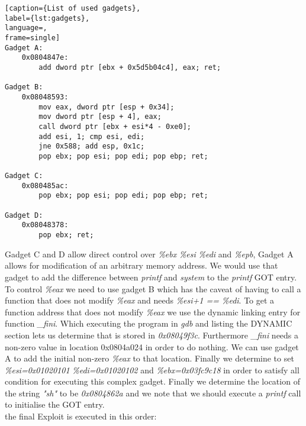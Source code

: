 \begin{minipage}{\linewidth}
\begin{lstlisting}[caption={List of used gadgets},
label={lst:gadgets},
language=,
frame=single]
Gadget A:
	0x0804847e:
		add dword ptr [ebx + 0x5d5b04c4], eax; ret;

Gadget B:
	0x08048593:
		mov eax, dword ptr [esp + 0x34];
		mov dword ptr [esp + 4], eax;
		call dword ptr [ebx + esi*4 - 0xe0];
		add esi, 1; cmp esi, edi;
		jne 0x588; add esp, 0x1c;
		pop ebx; pop esi; pop edi; pop ebp; ret;

Gadget C:
	0x080485ac:
		pop ebx; pop esi; pop edi; pop ebp; ret;

Gadget D:
	0x08048378:
		pop ebx; ret;
\end{lstlisting}
\end{minipage}

Gadget C and D allow direct control over \emph{\%ebx} \emph{\%esi} \emph{\%edi} and \emph{\%epb}, Gadget A allows for modification of an arbitrary memory address. We would use that gadget to add the difference between \emph{printf} and \emph{system} to the \emph{printf} GOT entry. To control \emph{\%eax} we need to use gadget B which has the caveat of having to call a function that does not modify \emph{\%eax} and needs \emph{\%esi+1 == \%edi}. To get a function address that does not modify \emph{\%eax} we use the dynamic linking entry for function \emph{\_fini}. Which executing the program in \emph{gdb} and listing the DYNAMIC section lets us determine that is stored in \emph{0x08049f3c}. Furthermore \emph{\_fini} needs a non-zero value in location 0x0804a024 in order to do nothing. We can use gadget A to add the initial non-zero \emph{\%eax} to that location. Finally we determine to set \emph{\%esi=0x01020101} \emph{\%edi=0x01020102} and \emph{\%ebx=0x03fc9c18} in order to satisfy all condition for executing this complex gadget. Finally we determine the location of the string \emph{"sh"} to be \emph{0x0804862a} and we note that we should execute a \emph{printf} call to initialise the GOT entry. \\
the final Exploit is executed in this order:

